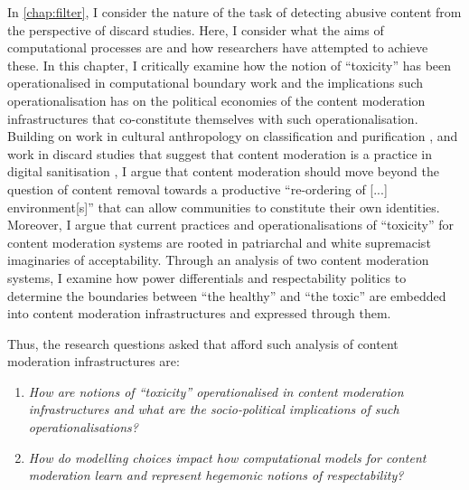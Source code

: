 In \cref{chap:filter}, I consider the nature of the task of detecting abusive content from the perspective of discard studies.
Here, I consider what the aims of computational processes are and how researchers have attempted to achieve these.
In this chapter, I critically examine how the notion of ``toxicity'' has been operationalised in computational boundary work and the implications such operationalisation has on the political economies of the content moderation infrastructures that co-constitute themselves with such operationalisation.
Building on work in cultural anthropology on classification and purification \citep{Douglas:1966}, and work in discard studies that suggest that content moderation is a practice in digital sanitisation \citep{Lepawsky:2019} , I argue that content moderation should move beyond the question of content removal towards a productive ``re-ordering of [...] environment[s]'' \citep{Douglas:1966} that can allow communities to constitute their own identities.
Moreover, I argue that current practices and operationalisations of ``toxicity'' for content moderation systems are rooted in patriarchal and white supremacist imaginaries of acceptability.
Through an analysis of two content moderation systems, I examine how power differentials and respectability politics to determine the boundaries between ``the healthy'' and ``the toxic'' are embedded into content moderation infrastructures and expressed through them.

Thus, the research questions asked that afford such analysis of content moderation infrastructures are:

\begin{center}
\begin{minipage}{0.9\textwidth}
\vspace{5mm}
    \begin{enumerate}[start=1, label={\textbf{RQ \arabic*}}]
        \item{\textit{How are notions of ``toxicity'' operationalised in content moderation infrastructures and what are the socio-political implications of such operationalisations?}}
        \item{\textit{How do modelling choices impact how computational models for content moderation learn and represent hegemonic notions of respectability?}}
    \end{enumerate}
    \vspace{5mm}
\end{minipage}
\end{center}

